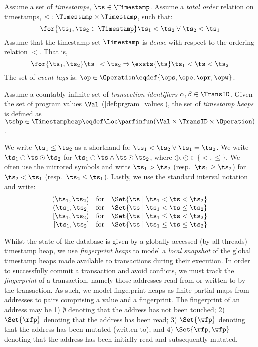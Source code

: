 \begin{definition}\label{def:timestamp_heaps}
Assume a set of \emph{timestamps}, $\ts \in \Timestamp$. Assume a \emph{total order} relation on timestamps, $<\ : \Timestamp \times \Timestamp$, such that:
%
\[
	\for{\ts_1, \ts_2 \in \Timestamp} \ts_1 < \ts_2 \lor \ts_2 < \ts_1
\]
%
Assume that the timestamp set $\Timestamp$ is \emph{dense} with respect to the ordering relation $<$. That is,
\[
	\for{\ts_1, \ts_2} \ts_1 < \ts_2 
	\Rightarrow 
	\exsts{\ts} \ts_1 < \ts < \ts_2	
\]
%
The set of \emph{event tags} is: $\op \in \Operation \eqdef \{\ops, \ope, \opr, \opw \}$. 

\noindent Assume a countably infinite set of \emph{transaction identifiers} $\alpha, \beta \in \TransID$.
Given the set of program values $\Val$ (\ref{def:prgram_values}), the set of \emph{timestamp heaps} is defined as $\tshp \in \Timestampheap \eqdef \Loc \parfinfun (\Val \times \TransID \times \Operation)$.
\end{definition}
%
%
We write $\ts_1 \leq \ts_2$ as a shorthand for $\ts_1 < \ts_2 \lor \ts_1 = \ts_2$.
We write $\ts_1 \oplus \ts \odot \ts_2 $ for $\ts_1 \oplus \ts \land \ts \odot \ts_2 $, where $\oplus, \odot \in \{<, \leq\}$.
We often use the mirrored symbols and write $\ts_1 > \ts_2$ (resp.~$\ts_1 \geq \ts_2$) for $\ts_2 < \ts_1$ (resp.~$\ts_2 \leq \ts_1$).
Lastly, we use the standard interval notation and write:
%
\[
\begin{array}{r @{\hspace{10pt}} c @{\hspace{10pt}} l}
	(\ts_1, \ts_2) & \text{for} & \Set{\ts \mid \ts_1 < \ts < \ts_2 } \\
	(\ts_1, \ts_2] & \text{for} & \Set{\ts \mid \ts_1 < \ts \leq \ts_2 } \\
	{[\ts_1, \ts_2)} & \text{for} & \Set{\ts \mid \ts_1 \leq \ts < \ts_2 } \\	
	{[\ts_1, \ts_2]} & \text{for} & \Set{\ts \mid \ts_1 \leq \ts \leq \ts_2 } 
\end{array}
\]
%

Whilst the state of the database is given by a globally-accessed (by all threads) timestamp heap, we use \emph{fingerprint heaps} to model a \emph{local snapshot} of the global timestamp heaps made available to transactions during their execution. In order to successfully commit a transaction and avoid conflicts, we must track the \emph{fingerprint} of a transaction, namely those addresses read from or written to by the transaction. As such, we model fingerprint heaps as finite partial maps from addresses to pairs comprising a value and a fingerprint. The fingerprint of an address may be 1) $\emptyset$ denoting that the address has not been touched; 2) $\Set{\rfp}$ denoting that the address has been read; 3) $\Set{\wfp}$ denoting that the address has been mutated (written to); and 4) $\Set{\rfp, \wfp}$ denoting that the address has been initially read and subsequently mutated.   

